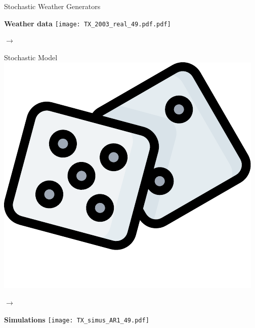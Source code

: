 \usepackage{mdframed}



\begin{frame}{Stochastic Weather Generators}
    \begin{minipage}{0.345\linewidth}
        \centering
        \textbf{Weather data}
        \texttt{[image: TX\_2003\_real\_49.pdf.pdf]}
    \end{minipage}\hfill%
    \begin{minipage}{0.05\linewidth}
        $\longrightarrow$
    \end{minipage}\hfill%
    \begin{minipage}{0.2\linewidth}
        \begin{mdframed}
            \centering
            Stochastic Model
            \includegraphics[width =0.8\linewidth]{logo_swg_dice.pdf}
        \end{mdframed}
    \end{minipage}\hfill%
    \begin{minipage}{0.05\linewidth}
        $\longrightarrow$
    \end{minipage}\hfill%
    \begin{minipage}{0.345\linewidth}
        \centering
        \textbf{Simulations}
        \texttt{[image: TX\_simus\_AR1\_49.pdf]}
    \end{minipage}
    \\



\end{frame}
